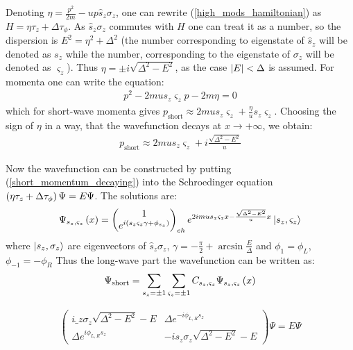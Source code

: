 Denoting $ \eta = \frac{p^2}{2m}-up\hat{s}_z\sigma_z $, one can rewrite (\ref{high_mods_hamiltonian}) as $ H=\eta\tau_z+\Delta\tau_\phi $. As $ \hat{s}_z\sigma_z $ commutes with $ H $ one can treat it as a number, so the dispersion is $ E^2 =\eta^2+\Delta^2 $ (the number corresponding to eigenstate of $ \hat{s}_z $ will be denoted as $ s_z $ while the number, corresponding to the eigenstate of $ \sigma_z $ will be denoted as $ \varsigma_z $). Thus $ \eta=\pm i\sqrt{\Delta^2-E^2} $, as the case $ \left|E\right|<\Delta $ is assumed. For momenta\textbf{} one can write the equation:
\begin{gather}
	p^2-2mu s_z \varsigma_z p - 2m \eta =0
\end{gather}
which for short-wave momenta gives $ p_{\mathrm{short}}\approx2 mu s_z \varsigma_z + \frac{\eta}{u}s_z\varsigma_z$. Choosing the sign of $ \eta $ in a way, that the wavefunction decays at $ x\to +\infty $, we obtain:
\begin{gather}
\label{short_momentum_decaying}
	p_{\mathrm{short}}\approx
	2 mu s_z \varsigma_z 
	+
	i\frac{\sqrt{\Delta^2-E^2}}{u}
\end{gather}


Now the wavefunction can be constructed by putting (\ref{short_momentum_decaying}) into the Schroedinger equation $ \left(\eta\tau_z +\Delta\tau_\phi\right)\Psi=E\Psi $. The solutions are:
\begin{gather}
	\Psi_{s_z,\varsigma_z}\left(x\right)
	=
	\begin{pmatrix}
	1
	\\
	e^{i\left(s_z\varsigma_z\gamma+\phi_{s_z}\right)}
	\end{pmatrix}_{eh}
	e^{2imus_z\varsigma_zx -\frac{\sqrt{\Delta^2-E^2}}{u}x}
	\ket{s_z, \varsigma_z}
\end{gather}
where  $ \ket{s_z, \sigma_z} $ are eigenvectors of $ \hat{s}_z \sigma_z $,  $ \gamma = -\frac{\pi}{2}+\arcsin\frac{E}{\Delta} $ and $ \phi_{1}=\phi_L$, $ \phi_{-1}=-\phi_R $
Thus the long-wave part the wavefunction can be written as:
\begin{gather}
\label{fast_mode_expansion}
	\Psi_{\mathrm{short}}
	=
	\sum_{s_z=\pm 1}
	\sum_{\varsigma_z=\pm 1}
	C_{s_z,\varsigma_z}
	\Psi_{s_z,\varsigma_z}\left(x\right)
\end{gather}
 
\begin{gather}
\begin{pmatrix}
i \hat_z \sigma_z\sqrt{\Delta^2-E^2}-E & \Delta e^{-i\phi_{L,R} s_z} \\
\Delta e^{i\phi_{L,R} s_z} & -i s_z \sigma_z\sqrt{\Delta^2-E^2}-E
\end{pmatrix}
\Psi
=
E\Psi
\end{gather}
\fi


